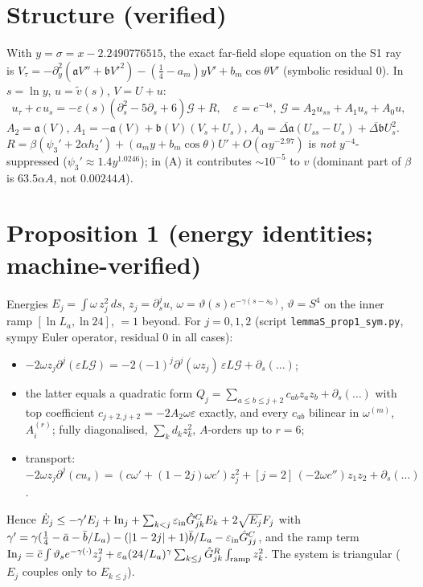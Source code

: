\documentclass[11pt]{article}
\begin{document}
\section{Structure (verified)}
With $y=\sigma=x-2.2490776515$, the exact far-field slope equation on the S1 ray is $V_\tau=-\partial_y^2(\mathfrak aV''+\mathfrak bV'^2)-(\tfrac14-a_m)yV'+b_m\cos\theta V'$ (symbolic residual $0$). In $s=\ln y$, $u=\tilde v(s)$, $V=U+u$:
$$u_\tau+c\,u_s=-\varepsilon(s)(\partial_s^2-5\partial_s+6)\mathcal G+R,\quad \varepsilon=e^{-4s},\ \mathcal G=A_2u_{ss}+A_1u_s+A_0u,$$
$A_2=\mathfrak a(V)$, $A_1=-\mathfrak a(V)+\mathfrak b(V)(V_s+U_s)$, $A_0=\overline{\Delta\mathfrak a}(U_{ss}-U_s)+\overline{\Delta\mathfrak b}U_s^2$. $R=\beta(\psi_3'+2\alpha h_2')+(a_my+b_m\cos\theta)U'+O(\alpha y^{-2.97})$ is \emph{not} $y^{-4}$-suppressed ($\psi_3'\approx1.4y^{1.0246}$); in (A) it contributes $\sim10^{-5}$ to $v$ (dominant part of $\beta$ is $63.5\alpha A$, not $0.00244A$).

\section{Proposition 1 (energy identities; machine-verified)}
Energies $E_j=\int\omega\,z_j^2\,ds$, $z_j=\partial_s^ju$, $\omega=\vartheta(s)e^{-\gamma(s-s_0)}$, $\vartheta=S^4$ on the inner ramp $[\ln L_a,\ln24]$, $=1$ beyond. For $j=0,1,2$ (script \texttt{lemmaS\_prop1\_sym.py}, sympy Euler operator, residual $0$ in all cases):
\begin{itemize}
\item $-2\omega z_j\partial^j(\varepsilon L\mathcal G)=-2(-1)^j\partial^j(\omega z_j)\,\varepsilon L\mathcal G+\partial_s(\dots)$;
\item the latter equals a quadratic form $Q_j=\sum_{a\le b\le j+2}c_{ab}z_az_b+\partial_s(\dots)$ with top coefficient $c_{j+2,j+2}=-2A_2\omega\varepsilon$ exactly, and every $c_{ab}$ bilinear in $\omega^{(m)}$, $A_i^{(r)}$; fully diagonalised, $\sum_kd_kz_k^2$, $A$-orders up to $r=6$;
\item transport: $-2\omega z_j\partial^j(cu_s)=(c\omega'+(1-2j)\omega c')z_j^2+[j=2]\,(-2\omega c'')z_1z_2+\partial_s(\dots)$.
\end{itemize}
Hence $\dot E_j\le-\gamma' E_j+{\rm In}_j+\sum_{k<j}\varepsilon_{\rm in}\hat G^C_{jk}E_k+2\sqrt{E_j}F_j$ with
$\gamma'=\gamma(\tfrac14-\bar a-\bar b/L_a)-(|1-2j|+1)\bar b/L_a-\varepsilon_{\rm in}\hat G^C_{jj}$, and the ramp term ${\rm In}_j=\bar c\int\vartheta_se^{-\gamma(\cdot)}z_j^2+\varepsilon_a(24/L_a)^\gamma\sum_{k\le j}\hat G^R_{jk}\int_{\rm ramp}z_k^2$. The system is triangular ($E_j$ couples only to $E_{k\le j}$).
\end{document}
